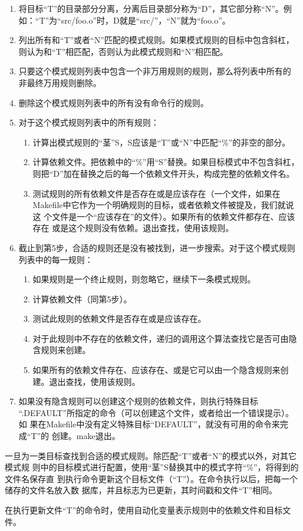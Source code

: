 \begin{enumerate}
\itemsep=4pt \parskip=0pt
  \item 将目标“T”的目录部分分离，分离后目录部分称为“D”，其它部分称“N”。例
      如：“T”为“src/foo.o”时，D就是“src/”，“N”就为“foo.o”。
  \item 列出所有和“T”或者“N”匹配的模式规则。如果模式规则的目标中包含斜杠，
      则认为和“T”相匹配，否则认为此模式规则和“N”相匹配。
  \item 只要这个模式规则列表中包含一个非万用规则的规则，那么将列表中所有的
      非最终万用规则删除。
  \item 删除这个模式规则列表中的所有没有命令行的规则。
  \item 对于这个模式规则列表中的所有规则：

\begin{enumerate}
  \item 计算出模式规则的“茎”S，S应该是“T”或“N”中匹配“\%”的非空的部分。
  \item 计算依赖文件。把依赖中的“\%”用“S”替换。如果目标模式中不包含斜杠，
      则把“D”加在替换之后的每一个依赖文件开头，构成完整的依赖文件名。
  \item 测试规则的所有依赖文件是否存在或是应该存在（一个文件，如果在
      Makefile中它作为一个明确规则的目标，或者依赖文件被提及，我们就说这
      个文件是一个“应该存在”的文件）。如果所有的依赖文件都存在、应该存在
      或是这个规则没有依赖。退出查找，使用该规则。
\end{enumerate}

  \item 截止到第5步，合适的规则还是没有被找到，进一步搜索。对于这个模式规则
      列表中的每一规则：

\begin{enumerate}
  \item 如果规则是一个终止规则，则忽略它，继续下一条模式规则。
  \item 计算依赖文件（同第5步）。
  \item 测试此规则的依赖文件是否存在或是应该存在。
  \item 对于此规则中不存在的依赖文件，递归的调用这个算法查找它是否可由隐
      含规则来创建。
  \item 如果所有的依赖文件存在、应该存在、或是它可以由一个隐含规则来创
      建。退出查找，使用该规则。
\end{enumerate}


  \item 如果没有隐含规则可以创建这个规则的依赖文件，则执行特殊目标
      “.DEFAULT”所指定的命令（可以创建这个文件，或者给出一个错误提示）。如
      果在Makefile中没有定义特殊目标“DEFAULT”，就没有可用的命令来完成“T”的
      创建。make退出。
\end{enumerate}


一旦为一类目标查找到合适的模式规则。除匹配“T”或者“N”的模式以外，对其它模式规
则中的目标模式进行配置，使用“茎”S替换其中的模式字符“\%”，将得到的文件名保存直
到执行命令更新这个目标文件（“T”）。在命令执行以后，把每一个储存的文件名放入数
据库，并且标志为已更新，其时间戳和文件“T”相同。

在执行更新文件“T”的命令时，使用自动化变量表示规则中的依赖文件和目标文件。
